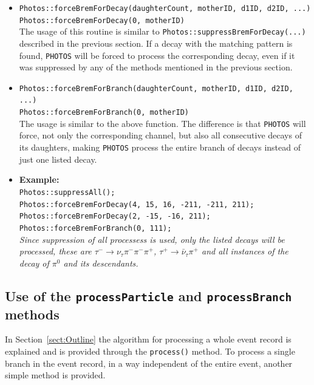 \documentclass[]{Photos_interface_design}
\begin{document}
\begin{itemize}

 \item {\tt Photos::forceBremForDecay(daughterCount, motherID, d1ID, d2ID, ...)} \hfill \\
       {\tt Photos::forceBremForDecay(0, motherID)} \hfill \\
       The usage of this routine is similar to {\tt Photos::suppressBremForDecay(...)}
	   described in the previous section. If a decay with the matching pattern is found,
	   {\tt PHOTOS} will be forced to process the corresponding decay, even if it was suppressed
	   by any of the methods mentioned in the previous section.
 \item {\tt Photos::forceBremForBranch(daughterCount, motherID, d1ID, d2ID, ...)} \hfill \\
       {\tt Photos::forceBremForBranch(0, motherID)} \hfill \\
       The usage is similar to the above function. The difference is
	   that {\tt PHOTOS} will force, not only the corresponding channel,
	   but also all consecutive decays of its daughters, making {\tt PHOTOS} process the entire branch
	   of decays instead of just one listed decay.
 \item \textbf{Example:} \hfill \\
{\tt Photos::suppressAll(); } \\
{\tt Photos::forceBremForDecay(4, 15, 16, -211, -211, 211); } \\
{\tt Photos::forceBremForDecay(2, -15, -16, 211); } \\
{\tt Photos::forceBremForBranch(0, 111); } \\
\emph{Since suppression of all processess is used, only the listed decays will be processed,
      these are $\tau^- \rightarrow \nu_\tau \pi^- \pi^- \pi^+$, $\tau^+ \rightarrow \bar \nu_\tau \pi^+$
      and all instances of the decay of $\pi^0$ and its descendants.}
\end{itemize}

\subsection{Use of the {\tt processParticle} and {\tt processBranch} methods}
\label{PHOTOSgun}

In Section~\ref{sect:Outline} the algorithm for processing a whole
event record is explained and is provided through the {\tt process()}
method.  To process a single branch in the event record, in a way
independent of the entire event, another simple method is provided.
\end{document}
